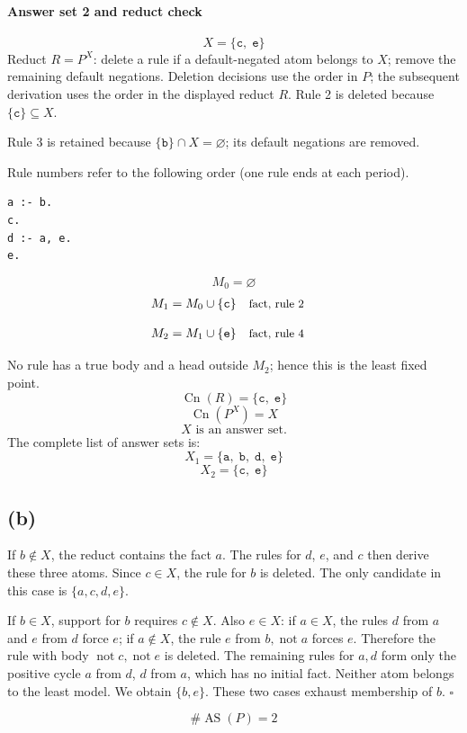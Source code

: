 \documentclass[a4paper,11pt]{article}
\newif\ifexplain
\newcommand{\explain}[1]{\ifexplain\begin{erklbox}#1\end{erklbox}\fi}
\newcommand{\why}[1]{\text{\small #1}}
\newcommand{\teil}[1]{\subsection*{(#1)}}
\newcommand{\at}[1]{\texttt{#1}}
\begin{document}
\paragraph{Answer set 2 and reduct check}
\[
X=\{\at{c},\;\at{e}\}
\]
Reduct $R=P^X$: delete a rule if a default-negated atom belongs to $X$; remove the remaining default negations. Deletion decisions use the order in $P$; the subsequent derivation uses the order in the displayed reduct $R$.
Rule 2 is deleted because $\{\at{c}\}\subseteq X$.

Rule 3 is retained because $\{\at{b}\}\cap X=\varnothing$; its default negations are removed.

Rule numbers refer to the following order (one rule ends at each period).
\begin{small}
\begin{verbatim}
a :- b.
c.
d :- a, e.
e.
\end{verbatim}
\end{small}
\explain{Beim Redukt bleibt die Kandidatenmenge fest. Wir entscheiden zuerst, welche Regeln wegfallen. Erst danach berechnen wir aus den verbleibenden positiven Regeln die kleinste abgeschlossene Menge. Ein Modell allein reicht nicht: Diese Menge muss genau der Kandidat sein.}
\[
M_0=\varnothing
\]
\begin{align*}
M_{1} &= M_{0}\cup \{\at{c}\} && \why{fact, rule 2}
\end{align*}
\explain{Diese Regel hat keinen Körper. Ihr Kopf $\at{c}$ ist damit ein Fakt und muss in die Menge.}
\begin{align*}
M_{2} &= M_{1}\cup \{\at{e}\} && \why{fact, rule 4}
\end{align*}
\explain{Diese Regel hat keinen Körper. Ihr Kopf $\at{e}$ ist damit ein Fakt und muss in die Menge.}
No rule has a true body and a head outside $M_{2}$; hence this is the least fixed point.
\[
\operatorname{Cn}(R)=\{\at{c},\;\at{e}\}
\]
\[
\operatorname{Cn}(P^X)=X
\]
\[
\boxed{X\text{ is an answer set.}}
\]
The complete list of answer sets is:
\[
\boxed{X_1=\{\at{a},\;\at{b},\;\at{d},\;\at{e}\}}
\]
\[
\boxed{X_2=\{\at{c},\;\at{e}\}}
\]
\teil{b}
If $b\notin X$, the reduct contains the fact $a$. The rules for $d$, $e$, and $c$ then derive these three atoms. Since $c\in X$, the rule for $b$ is deleted. The only candidate in this case is $\{a,c,d,e\}$.

If $b\in X$, support for $b$ requires $c\notin X$. Also $e\in X$: if $a\in X$, the rules $d$ from $a$ and $e$ from $d$ force $e$; if $a\notin X$, the rule $e$ from $b,\mathop{not}a$ forces $e$. Therefore the rule with body $\mathop{not}c,\mathop{not}e$ is deleted. The remaining rules for $a,d$ form only the positive cycle $a$ from $d$, $d$ from $a$, which has no initial fact. Neither atom belongs to the least model. We obtain $\{b,e\}$. These two cases exhaust membership of $b$. $\square$
\explain{Wir teilen nur nach Atomen auf, die eine echte Entscheidung durch Default-Negation auslösen. Danach erzwingen Fakten und Regeln den Rest. Ein positiver Kreis begründet sich nicht selbst: Ohne Startregel bleibt er beim Aufbau der kleinsten Menge leer.}
\[
\boxed{\#\operatorname{AS}(P)=2}
\]
\end{document}
